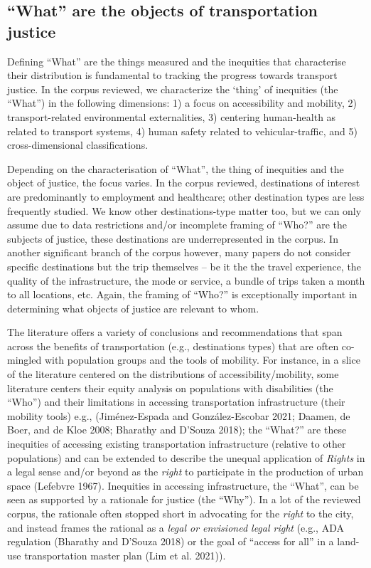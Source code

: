 \documentclass[12pt, oneside]{report}
\begin{document}
\hypertarget{what-are-the-objects-of-transportation-justice}{%
\subsection{``What'' are the objects of transportation
justice}\label{what-are-the-objects-of-transportation-justice}}

Defining ``What'' are the things measured and the inequities that
characterise their distribution is fundamental to tracking the progress
towards transport justice. In the corpus reviewed, we characterize the
`thing' of inequities (the ``What'') in the following dimensions: 1) a
focus on accessibility and mobility, 2) transport-related environmental
externalities, 3) centering human-health as related to transport
systems, 4) human safety related to vehicular-traffic, and 5)
cross-dimensional classifications.

Depending on the characterisation of ``What'', the thing of inequities
and the object of justice, the focus varies. In the corpus reviewed,
destinations of interest are predominantly to employment and healthcare;
other destination types are less frequently studied. We know other
destinations-type matter too, but we can only assume due to data
restrictions and/or incomplete framing of ``Who?'' are the subjects of
justice, these destinations are underrepresented in the corpus. In
another significant branch of the corpus however, many papers do not
consider specific destinations but the trip themselves -- be it the the
travel experience, the quality of the infrastructure, the mode or
service, a bundle of trips taken a month to all locations, etc. Again,
the framing of ``Who?'' is exceptionally important in determining what
objects of justice are relevant to whom.

The literature offers a variety of conclusions and recommendations that
span across the benefits of transportation (e.g., destinations types)
that are often co-mingled with population groups and the tools of
mobility. For instance, in a slice of the literature centered on the
distributions of accessibility/mobility, some literature centers their
equity analysis on populations with disabilities (the ``Who'') and their
limitations in accessing transportation infrastructure (their mobility
tools) e.g., (Jiménez-Espada and González-Escobar 2021; Daamen, de Boer,
and de Kloe 2008; Bharathy and D'Souza 2018); the ``What?'' are these
inequities of accessing existing transportation infrastructure (relative
to other populations) and can be extended to describe the unequal
application of \emph{Rights} in a legal sense and/or beyond as the
\emph{right} to participate in the production of urban space (Lefebvre
1967). Inequities in accessing infrastructure, the ``What'', can be seen
as supported by a rationale for justice (the ``Why''). In a lot of the
reviewed corpus, the rationale often stopped short in advocating for the
\emph{right} to the city, and instead frames the rational as a
\emph{legal or envisioned legal right} (e.g., ADA regulation (Bharathy
and D'Souza 2018) or the goal of ``access for all'' in a land-use
transportation master plan (Lim et al. 2021)).
\end{document}
